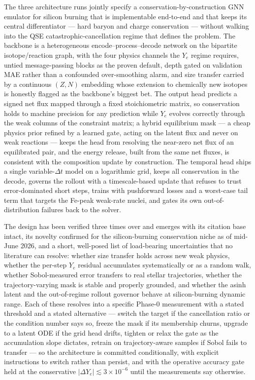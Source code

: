 \documentclass[11pt]{article}
\newcommand{\Ye}{Y_{e}}
\newcommand{\dYe}{\Delta Y_{e}}
\begin{document}
The three architecture runs jointly specify a conservation-by-construction GNN emulator for silicon burning that is implementable end-to-end and that keeps its central differentiator --- hard baryon and charge conservation --- without walking into the QSE catastrophic-cancellation regime that defines the problem. The backbone is a heterogeneous encode--process--decode network on the bipartite isotope/reaction graph, with the four physics channels the $\Ye$ regime requires, untied message-passing blocks as the proven default, depth gated on validation MAE rather than a confounded over-smoothing alarm, and size transfer carried by a continuous $(Z,N)$ embedding whose extension to chemically new isotopes is honestly flagged as the backbone's biggest bet. The output head predicts a signed net flux mapped through a fixed stoichiometric matrix, so conservation holds to machine precision for any prediction while $\Ye$ evolves correctly through the weak columns of the constraint matrix; a hybrid equilibrium mask --- a cheap physics prior refined by a learned gate, acting on the latent flux and never on weak reactions --- keeps the head from resolving the near-zero net flux of an equilibrated pair, and the energy release, built from the same net fluxes, is consistent with the composition update by construction. The temporal head ships a single variable-$\Delta t$ model on a logarithmic grid, keeps all conservation in the decode, governs the rollout with a timescale-based update that refuses to trust error-dominated short steps, trains with pushforward losses and a worst-case tail term that targets the Fe-peak weak-rate nuclei, and gates its own out-of-distribution failures back to the solver.

The design has been verified three times over and emerges with its citation base intact, its novelty confirmed for the silicon-burning conservation niche as of mid-June 2026, and a short, well-posed list of load-bearing uncertainties that no literature can resolve: whether size transfer holds across new weak physics, whether the per-step $\Ye$ residual accumulates systematically or as a random walk, whether Sobol-measured error transfers to real stellar trajectories, whether the trajectory-varying mask is stable and properly grounded, and whether the asinh latent and the out-of-regime rollout governor behave at silicon-burning dynamic range. Each of these resolves into a specific Phase-0 measurement with a stated threshold and a stated alternative --- switch the target if the cancellation ratio or the condition number says so, freeze the mask if its membership churns, upgrade to a latent ODE if the grid head drifts, tighten or relax the gate as the accumulation slope dictates, retrain on trajectory-aware samples if Sobol fails to transfer --- so the architecture is committed conditionally, with explicit instructions to switch rather than persist, and with the operative accuracy gate held at the conservative $|\dYe| \lesssim 3\times10^{-6}$ until the measurements say otherwise.
\end{document}
